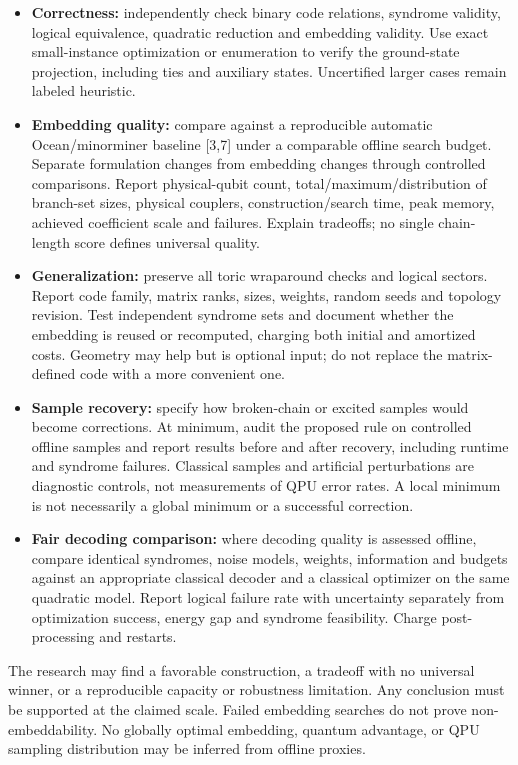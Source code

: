 \documentclass[11pt,letterpaper]{article}
\begin{document}
\begin{itemize}\item \textbf{Correctness:} independently check binary code relations, syndrome validity, logical equivalence, quadratic reduction and embedding validity. Use exact small-instance optimization or enumeration to verify the ground-state projection, including ties and auxiliary states. Uncertified larger cases remain labeled heuristic.
\item \textbf{Embedding quality:} compare against a reproducible automatic Ocean/minorminer baseline [3,7] under a comparable offline search budget. Separate formulation changes from embedding changes through controlled comparisons. Report physical-qubit count, total/maximum/distribution of branch-set sizes, physical couplers, construction/search time, peak memory, achieved coefficient scale and failures. Explain tradeoffs; no single chain-length score defines universal quality.
\item \textbf{Generalization:} preserve all toric wraparound checks and logical sectors. Report code family, matrix ranks, sizes, weights, random seeds and topology revision. Test independent syndrome sets and document whether the embedding is reused or recomputed, charging both initial and amortized costs. Geometry may help but is optional input; do not replace the matrix-defined code with a more convenient one.
\item \textbf{Sample recovery:} specify how broken-chain or excited samples would become corrections. At minimum, audit the proposed rule on controlled offline samples and report results before and after recovery, including runtime and syndrome failures. Classical samples and artificial perturbations are diagnostic controls, not measurements of QPU error rates. A local minimum is not necessarily a global minimum or a successful correction.
\item \textbf{Fair decoding comparison:} where decoding quality is assessed offline, compare identical syndromes, noise models, weights, information and budgets against an appropriate classical decoder and a classical optimizer on the same quadratic model. Report logical failure rate with uncertainty separately from optimization success, energy gap and syndrome feasibility. Charge post-processing and restarts.\end{itemize}

The research may find a favorable construction, a tradeoff with no universal winner, or a reproducible capacity or robustness limitation. Any conclusion must be supported at the claimed scale. Failed embedding searches do not prove non-embeddability. No globally optimal embedding, quantum advantage, or QPU sampling distribution may be inferred from offline proxies.\par
\end{document}

